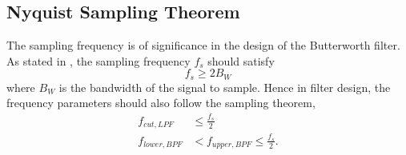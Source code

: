 \documentclass[../ECE459FinalProjectReport.tex]{subfiles}
\begin{document}
\subsection{Nyquist Sampling Theorem}
The sampling frequency is of significance in the design of the Butterworth filter. As stated in \cite[pp. 296--297]{manolakisAppliedDigitalSignal2011}, the sampling frequency $f_s$ should satisfy
\begin{equation}
    f_s \geq 2B_W
\end{equation}
where $B_W$ is the bandwidth of the signal to sample. Hence in filter design, the frequency parameters should also follow the sampling theorem,
\begin{align}
    f_{cut, LPF} &\leq \frac{f_s}{2} \\
    f_{lower, BPF}&< f_{upper, BPF}\leq \frac{f_s}{2}.
\end{align}
\end{document}

